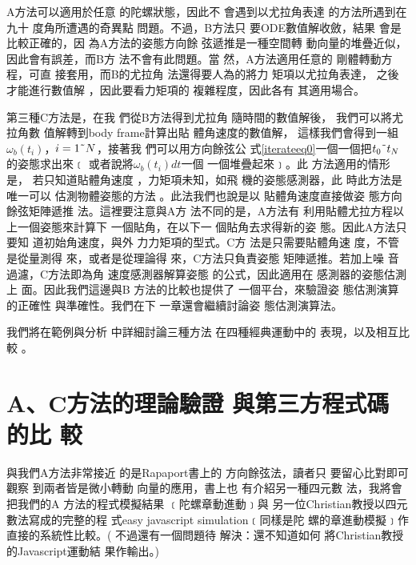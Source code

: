 \documentclass[12pt,twoside]{article}
\begin{document}
\bigskip

A方法可以適用於任意%
的陀螺狀態，因此不%
會遇到以尤拉角表達%
的方法所遇到在九十%
度角所遭遇的奇異點%
問題。不過，B方法只%
要ODE數值解收斂，結果%
會是比較正確的，因%
為A方法的姿態方向餘%
弦遞推是一種空間轉%
動向量的堆疊近似，%
因此會有誤差，而B方%
法不會有此問題。當%
然，A方法適用任意的%
剛體轉動方程，可直%
接套用，而B的尤拉角%
法還得要人為的將力%
矩項以尤拉角表達，%
之後才能進行數值解%
，因此要看力矩項的%
複雜程度，因此各有%
其適用場合。

\bigskip

第三種C方法是，在我%
們從B方法得到尤拉角%
隨時間的數值解後，%
我們可以將尤拉角數%
值解轉到body frame計算出貼%
體角速度的數值解，%
這樣我們會得到一組$%
\omega _{b}(t_{i})$，$i=1\symbol{126}N$，接著我%
們可以用方向餘弦公%
式\ref{iterateeq0}一個一個把$t_{0}%
\symbol{126}t_{N}$的姿態求出來﹝%
或者說將$\omega _{b}(t_{i})dt$一個%
一個堆疊起來﹞。此%
方法適用的情形是，%
若只知道貼體角速度%
，力矩項未知，如飛%
機的姿態感測器，此%
時此方法是唯一可以%
估測物體姿態的方法%
。此法我們也說是以%
貼體角速度直接做姿%
態方向餘弦矩陣遞推%
法。這裡要注意與A方%
法不同的是，A方法有%
利用貼體尤拉方程以%
上一個姿態來計算下%
一個貼角，在以下一%
個貼角去求得新的姿%
態。因此A方法只要知%
道初始角速度，與外%
力力矩項的型式。C方%
法是只需要貼體角速%
度，不管是從量測得%
來，或者是從理論得%
來，C方法只負責姿態%
矩陣遞推。若加上噪%
音過濾，C方法即為角%
速度感測器解算姿態%
的公式，因此適用在%
感測器的姿態估測上%
面。因此我們這邊與B%
方法的比較也提供了%
一個平台，來驗證姿%
態估測演算的正確性%
與準確性。我們在下%
一章還會繼續討論姿%
態估測演算法。

\bigskip

我們將在範例與分析%
中詳細討論三種方法%
在四種經典運動中的%
表現，以及相互比較%
。

\section{A、C方法的理論驗證%
與第三方程式碼的比%
較}

與我們A方法非常接近%
的是Rapaport書上\cite[Page 232]{rapaport}的%
方向餘弦法，讀者只%
要留心比對即可觀察%
到兩者皆是微小轉動%
向量的應用，書上也%
有介紹另一種四元數%
法，我將會把我們的A%
方法的程式模擬結果%
﹝陀螺章動進動﹞與%
另一位Christian教授以四元%
數法寫成的完整的程%
式easy javascript simulation﹝同樣是陀%
螺的章進動模擬﹞作%
直接的系統性比較。(%
不過還有一個問題待%
解決：還不知道如何%
將Christian教授的Javascript運動結%
果作輸出。)

\clearpage%
\end{document}
